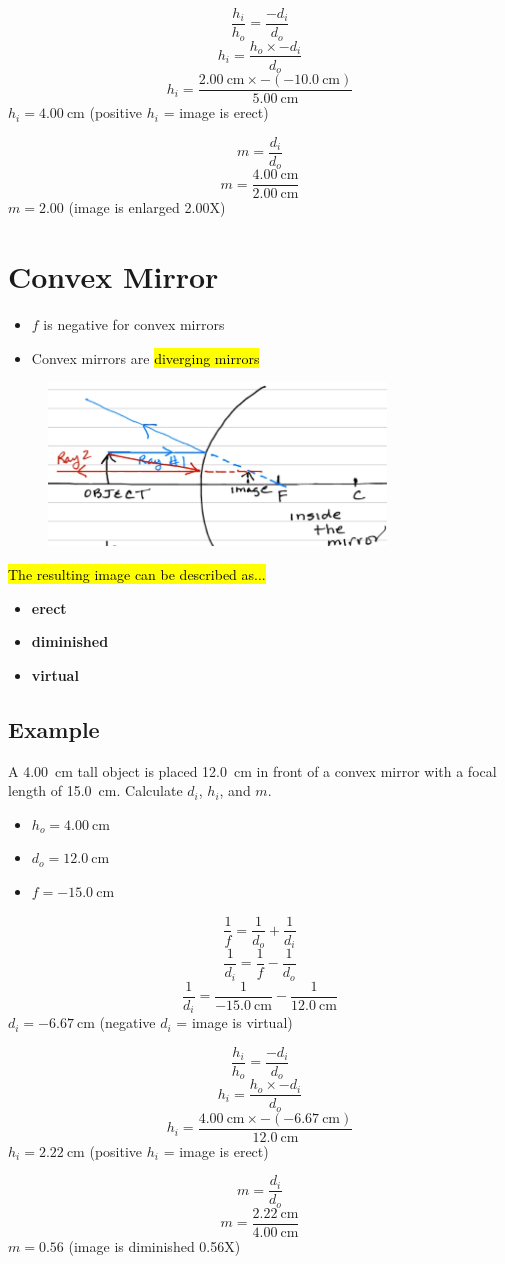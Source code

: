 \documentclass[a4paper,12pt]{article}
\begin{document}
$$\frac{h_i}{h_o} = \frac{-d_i}{d_o}$$
$$h_i = \frac{h_o \times -d_i}{d_o}$$
$$h_i = \frac{\SI{2.00}{\cm} \times -(\SI{-10.0}{\cm})}{\SI{5.00}{\cm}}$$
$h_i = \SI{4.00}{\cm}$ (positive $h_i$ = image is erect)

$$m = \frac{d_i}{d_o}$$
$$m = \frac{\SI{4.00}{\cm}}{\SI{2.00}{\cm}}$$
$m = \num{2.00}$ (image is enlarged 2.00X)

\pagebreak
\section{Convex Mirror}
\begin{itemize}
    \item{$f$ is negative for convex mirrors}
    \item{Convex mirrors are \hl{diverging mirrors}}
\end{itemize}

\begin{figure}[H]
    \centering
    \includegraphics[width=0.8\textwidth]{convex-mirror}
\end{figure}
\hl{The resulting image can be described as...}
\begin{itemize}
    \item{\textbf{erect}}
    \item{\textbf{diminished}}
    \item{\textbf{virtual}}
\end{itemize}

\subsection{Example}
A \SI{4.00}{\cm} tall object is placed \SI{12.0}{\cm} in front of a convex mirror with a focal length of \SI{15.0}{\cm}. Calculate $d_i$, $h_i$, and $m$.
\begin{itemize}
    \item{$h_o = \SI{4.00}{\cm}$}
    \item{$d_o = \SI{12.0}{\cm}$}
    \item{$f = \SI{-15.0}{\cm}$}
\end{itemize}
$$\frac{1}{f} = \frac{1}{d_o} + \frac{1}{d_i}$$
$$\frac{1}{d_i} = \frac{1}{f} - \frac{1}{d_o}$$
$$\frac{1}{d_i} = \frac{1}{\SI{-15.0}{\cm}} - \frac{1}{\SI{12.0}{\cm}}$$
$d_i = \SI{-6.67}{\cm}$ (negative $d_i$ = image is virtual)

$$\frac{h_i}{h_o} = \frac{-d_i}{d_o}$$
$$h_i = \frac{h_o \times -d_i}{d_o}$$
$$h_i = \frac{\SI{4.00}{\cm} \times -(\SI{-6.67}{\cm})}{\SI{12.0}{\cm}}$$
$h_i = \SI{2.22}{\cm}$ (positive $h_i$ = image is erect)

$$m = \frac{d_i}{d_o}$$
$$m = \frac{\SI{2.22}{\cm}}{\SI{4.00}{\cm}}$$
$m = \num{0.56}$ (image is diminished 0.56X)
\end{document}
